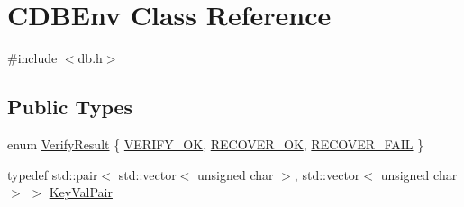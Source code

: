 \hypertarget{class_c_d_b_env}{}\section{C\+D\+B\+Env Class Reference}
\label{class_c_d_b_env}


{\ttfamily \#include $<$db.\+h$>$}

\subsection*{Public Types}
\begin{DoxyCompactItemize}
\item 
enum \hyperlink{class_c_d_b_env_a6fbf26da5d7f8f64a77a3ba15e4df244}{Verify\+Result} \{ \hyperlink{class_c_d_b_env_a6fbf26da5d7f8f64a77a3ba15e4df244ad1e78ccddf6bdf55ecf09d6936760661}{V\+E\+R\+I\+F\+Y\+\_\+\+O\+K}, 
\hyperlink{class_c_d_b_env_a6fbf26da5d7f8f64a77a3ba15e4df244a25eebe1e7f52e4e07a4c9b1e6abc4274}{R\+E\+C\+O\+V\+E\+R\+\_\+\+O\+K}, 
\hyperlink{class_c_d_b_env_a6fbf26da5d7f8f64a77a3ba15e4df244a0c9f58677b786e700258e8ad29579d75}{R\+E\+C\+O\+V\+E\+R\+\_\+\+F\+A\+I\+L}
 \}
\item 
typedef std\+::pair$<$ std\+::vector$<$ unsigned char $>$, std\+::vector$<$ unsigned char $>$ $>$ \hyperlink{class_c_d_b_env_a53fd285f09c312973caa6f90b33937f5}{Key\+Val\+Pair}
\end{DoxyCompactItemize}
